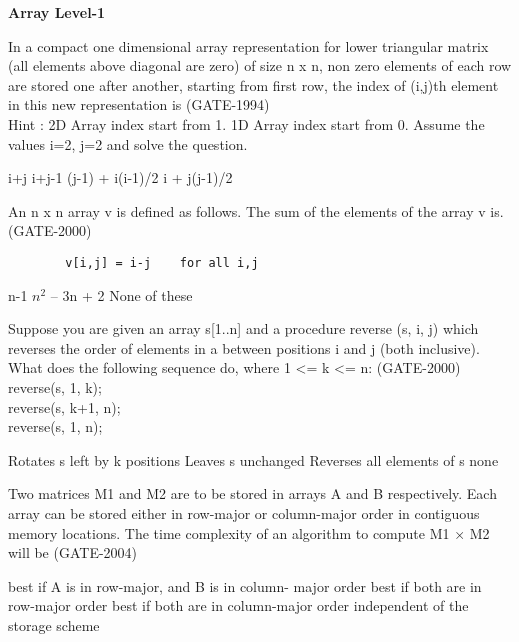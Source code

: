 \centerline{\textbf{ \LARGE Array Level-1}}

\begin{questyle}
  \question In a compact one dimensional array representation for lower triangular matrix (all elements above diagonal are zero) of
            size n x n, non zero elements of each row are stored one after another, starting from first row, the index of (i,j)th
            element in this new representation is  (GATE-1994) \\
            Hint : 2D Array index start from 1. 1D Array index start from 0. Assume the values i=2, j=2 and solve the question.
  \begin{choices}
    \choice         i+j
    \choice         i+j-1
    \CorrectChoice  (j-1) + i(i-1)/2
    \choice         i + j(j-1)/2
  \end{choices}
\end{questyle}

\begin{questyle}
  \question  An n x n array v is defined as follows. The sum of the elements of the array v is.  (GATE-2000)
    \begin{lstlisting}
        v[i,j] = i-j    for all i,j
    \end{lstlisting}
  \begin{choices}
    \choice         n-1
    \choice         \(n^2\) – 3n + 2
    \choice         None of these
  \end{choices}
\end{questyle}

\begin{questyle}
  \question  Suppose you are given an array s[1..n] and a procedure reverse (s, i, j) which reverses the order of
             elements in a between positions i and j (both inclusive). What does the following sequence do, where 1 <= k <= n:  (GATE-2000)\\
             reverse(s, 1, k); \\
             reverse(s, k+1, n); \\
             reverse(s, 1, n);
  \begin{choices}
    \CorrectChoice  Rotates s left by k positions
    \choice         Leaves s unchanged
    \choice         Reverses all elements of s
    \choice         none
  \end{choices}
\end{questyle}

\begin{questyle}
  \question  Two matrices M1 and M2 are to be stored in arrays A and B respectively. Each array can be stored
             either in row-major or column-major order in contiguous memory locations. The time complexity of an algorithm
             to compute M1 × M2 will be  (GATE-2004)

  \begin{choices}
    \choice         best if A is in row-major, and B is in column- major order
    \choice         best if both are in row-major order
    \choice         best if both are in column-major order
    \CorrectChoice  independent of the storage scheme
  \end{choices}
\end{questyle}
